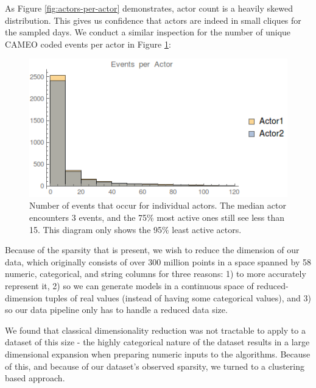 As Figure \ref{fig:actors-per-actor} demonstrates, actor count is a heavily skewed distribution. This gives us confidence that actors are indeed in small cliques for the sampled days. We conduct a similar inspection for the number of unique CAMEO coded events per actor in Figure \ref{fig:events-per-actor}:

\begin{figure}[ht]
\vskip 0.2in
\begin{center}
\centerline{\includegraphics[width=\columnwidth]{images/events-per-actor}}
\caption{Number of events that occur for individual actors. The median actor encounters 3 events, and the 75\% most active ones still see less than 15. This diagram only shows the 95\% least active actors.}
\end{center}
\vskip -0.2in
\label{fig:events-per-actor}
\end{figure} 

Because of the sparsity that is present, we wish to reduce the dimension of our data, which originally consists of over 300 million points in a space spanned by 58 numeric, categorical, and string columns for three reasons: 1) to more accurately represent it, 2) so we can generate models in a continuous space of reduced-dimension tuples of real values (instead of having some categorical values), and 3) so our data pipeline only has to handle a reduced data size.

We found that classical dimensionality reduction was not tractable to apply to a dataset of this size - the highly categorical nature of the dataset results in a large dimensional expansion when preparing numeric inputs to the algorithms. Because of this, and because of our dataset's observed sparsity, we turned to a clustering based approach. 

